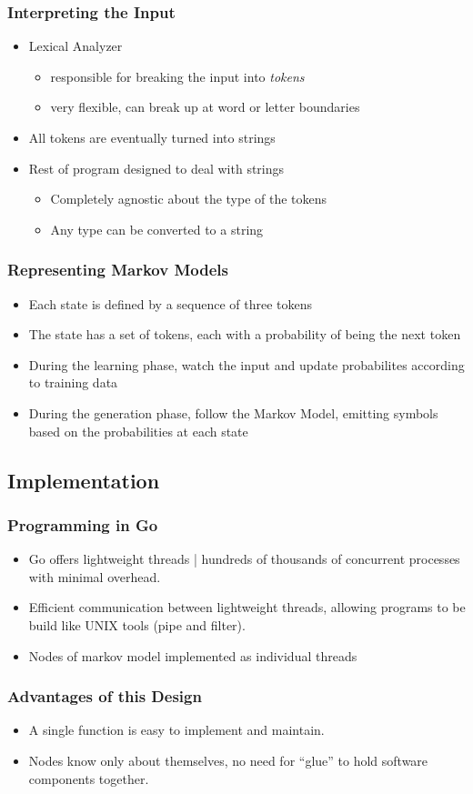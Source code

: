 \documentclass{beamer}
\begin{document}
\begin{frame}
   \frametitle{Interpreting the Input}
   \begin{itemize}
      \item Lexical Analyzer
      \begin{itemize}
         \item responsible for breaking the input into \emph{tokens}
         \item very flexible, can break up at word or letter boundaries
      \end{itemize}
      \item All tokens are eventually turned into strings
      \item Rest of program designed to deal with strings
      \begin{itemize}
         \item Completely agnostic about the type of the tokens
         \item Any type can be converted to a string
      \end{itemize}
   \end{itemize}
\end{frame}

\begin{frame}
   \frametitle{Representing Markov Models}
   \begin{itemize}
      \item Each state is defined by a sequence of three tokens
      \item The state has a set of tokens, each with a probability of being the
      next token
      \item During the learning phase, watch the input and update probabilites
      according to training data
      \item During the generation phase, follow the Markov Model, emitting
      symbols based on the probabilities at each state
   \end{itemize}
\end{frame}

\subsection{Implementation}

\begin{frame}
   \frametitle{Programming in Go}
   \begin{itemize}
      \item Go offers lightweight threads | hundreds of thousands of concurrent
      processes with minimal overhead.
      \item Efficient communication between lightweight threads, allowing
      programs to be build like UNIX tools (pipe and filter).
      \item Nodes of markov model implemented as individual threads
   \end{itemize}
\end{frame}

\begin{frame}
   \frametitle{Advantages of this Design}
   \begin{itemize}
      \item A single function is easy to implement and maintain.
      \item Nodes know only about themselves, no need for ``glue'' to hold
      software components together.
   \end{itemize}
\end{frame}
\end{document}
